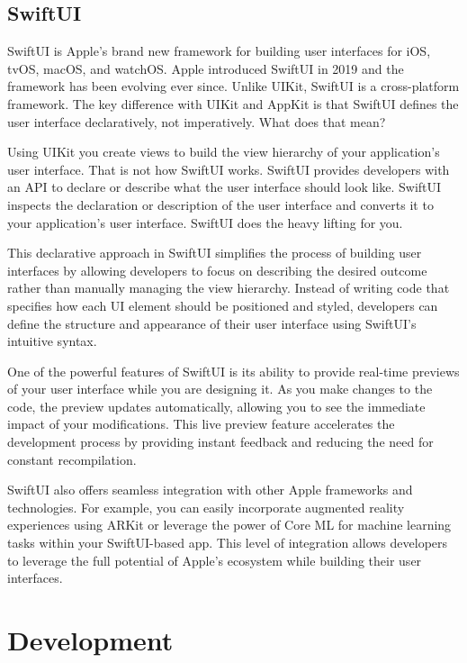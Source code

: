 \documentclass[a4paper,oneside]{article}
\begin{document}
\subsection{SwiftUI}

SwiftUI is Apple's brand new framework for building user interfaces for iOS, tvOS, macOS, and watchOS.
Apple introduced SwiftUI in 2019 and the framework has been evolving ever since.
Unlike UIKit, SwiftUI is a cross-platform framework. The key difference with UIKit and AppKit is that SwiftUI defines the user interface declaratively, not imperatively.
What does that mean?

Using UIKit you create views to build the view hierarchy of your application's user interface. That is not how SwiftUI works. SwiftUI provides developers with an API to declare or describe what the user interface should look like. SwiftUI inspects the declaration or description of the user interface and converts it to your application's user interface. SwiftUI does the heavy lifting for you.

This declarative approach in SwiftUI simplifies the process of building user interfaces by allowing developers to focus on describing the desired outcome rather than manually managing the view hierarchy. Instead of writing code that specifies how each UI element should be positioned and styled, developers can define the structure and appearance of their user interface using SwiftUI's intuitive syntax.

One of the powerful features of SwiftUI is its ability to provide real-time previews of your user interface while you are designing it. As you make changes to the code, the preview updates automatically, allowing you to see the immediate impact of your modifications. This live preview feature accelerates the development process by providing instant feedback and reducing the need for constant recompilation.

SwiftUI also offers seamless integration with other Apple frameworks and technologies. For example, you can easily incorporate augmented reality experiences using ARKit or leverage the power of Core ML for machine learning tasks within your SwiftUI-based app. This level of integration allows developers to leverage the full potential of Apple's ecosystem while building their user interfaces.


\newpage
\section{Development}
\end{document}
